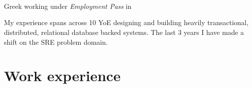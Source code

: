 \documentclass{CVSoftwareEngineer}
\begin{document}
	\section{\textbf{\cvname}}
	\begin{center}
		\href{mailto:\cvmail}{\cvmail} \space \textbar \space \cvlinkedin \space \textbar \space \cvgithub \\
		Greek working under \textit{Employment Pass} in \cvaddress
	\end{center}
	My experience spans across 10 YoE designing and building heavily transactional, distributed,
	relational database backed systems. The last 3 years I have made a shift on the SRE problem domain.

	\section{Work experience}
\end{document}
